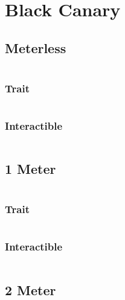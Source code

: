 \documentclass[main.tex]{subfiles}
\begin{document}
\chapter{Black Canary}

\section{Meterless}

\begin{lstlisting}[language=FG]
\end{lstlisting}

\subsection{Trait}

\begin{lstlisting}[language=FG]
\end{lstlisting}


\subsection{Interactible}
\begin{lstlisting}[language=FG]

\end{lstlisting}

\section{1 Meter}


\begin{lstlisting}[language=FG]
\end{lstlisting}

\subsection{Trait}

\begin{lstlisting}[language=FG]
\end{lstlisting}


\subsection{Interactible}
\begin{lstlisting}[language=FG]

\end{lstlisting}

\section{2 Meter}
\end{document}
